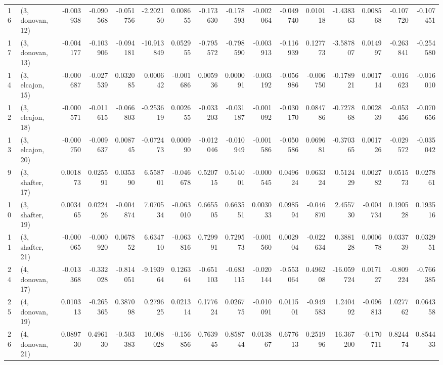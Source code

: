 \begin{tabular}{llrrrrrrrrrrrrrr}
16 &  (3, donovan, 12) &  -0.003938 & -0.090568 & -0.051756 &  -2.202150 &  0.008655 &  -0.173630 & -0.178593 & -0.002064 & -0.049740 &  0.010118 &  -1.438363 &  0.008568 & -0.107720 & -0.107451 \\
17 &  (3, donovan, 13) &  -0.004177 & -0.103906 & -0.094181 & -10.913849 &  0.052955 &  -0.795572 & -0.798590 & -0.003913 & -0.116939 &  0.127773 &  -3.587807 &  0.014997 & -0.263841 & -0.254580 \\
14 &  (3, elcajon, 15) &  -0.000687 & -0.027539 &  0.032085 &   0.000642 & -0.001686 &   0.005936 &  0.000091 & -0.003192 & -0.056986 & -0.006750 &  -0.178921 &  0.001714 & -0.016623 & -0.016010 \\
12 &  (3, elcajon, 18) &  -0.000571 & -0.011615 & -0.066803 &  -0.253619 &  0.002655 &  -0.033203 & -0.031187 & -0.001092 & -0.030170 &  0.084786 &  -0.727868 &  0.002839 & -0.053456 & -0.070656 \\
13 &  (3, elcajon, 20) &  -0.000750 & -0.009637 &  0.008745 &  -0.072473 &  0.000990 &  -0.012046 & -0.010949 & -0.001586 & -0.050586 &  0.069681 &  -0.370365 &  0.001726 & -0.029572 & -0.035042 \\
9  &  (3, shafter, 17) &   0.001873 &  0.025591 &  0.035390 &   6.558701 & -0.046678 &   0.520715 &  0.514001 & -0.000545 &  0.049624 &  0.063324 &   0.512429 &  0.002782 &  0.051573 &  0.027861 \\
10 &  (3, shafter, 19) &   0.003465 &  0.022426 & -0.004874 &   7.070534 & -0.063010 &   0.665505 &  0.663551 &  0.003033 &  0.098594 & -0.046870 &   2.455730 & -0.004734 &  0.190528 &  0.193516 \\
11 &  (3, shafter, 21) &  -0.000065 & -0.000920 &  0.067852 &   6.634710 & -0.063816 &   0.729991 &  0.729573 & -0.001560 &  0.002904 & -0.022634 &   0.388128 &  0.000678 &  0.033739 &  0.032951 \\
24 &  (4, donovan, 17) &  -0.013368 & -0.332028 & -0.814051 &  -9.193964 &  0.126364 &  -0.651103 & -0.683115 & -0.020144 & -0.553064 &  0.496208 & -16.059724 &  0.017127 & -0.809224 & -0.766385 \\
25 &  (4, donovan, 19) &   0.010313 & -0.265365 &  0.387098 &   0.279625 &  0.021314 &   0.177624 &  0.026775 & -0.010091 &  0.011501 & -0.949583 &   1.240492 & -0.096813 &  1.027762 &  0.064358 \\
26 &  (4, donovan, 21) &   0.089730 &  0.496130 & -0.503383 &  10.008028 & -0.156856 &   0.763945 &  0.858744 &  0.013867 &  0.677613 &  0.251996 &  16.367200 & -0.170711 &  0.824474 &  0.854433 \\

\end{tabular}
